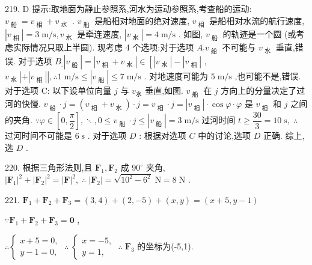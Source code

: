 219. D 提示:取地面为静止参照系,河水为运动参照系,考查船的运动: ${v}_{\text{ 船 }} = {v}_{\text{ 相 }} + {v}_{\text{ 水 }}$ . ${v}_{\text{ 船 }}$ 是船相对地面的绝对速度, ${v}_{\text{ 相 }}$ 是船相对水流的航行速度, $\left| {v}_{\text{ 相 }}\right|  = 3\mathrm{\;m}/\mathrm{s},{v}_{\text{ 水 }}$ 是牵连速度, $\left| {v}_{\text{ 水 }}\right|  = 4\mathrm{\;m}/\mathrm{s}$ . 如图, ${v}_{\text{ 船 }}$ 的轨迹是一个圆 (或考虑实际情况只取上半圆). 现考虑 4 个选项:对于选项 ${A}_{:}{v}_{\text{ 船 }}$ 不可能与 ${v}_{\text{ 水 }}$ 垂直,错误. 对于选项 ${B}_{:}\left| {v}_{\text{ 船 }}\right|  = \left| {{v}_{\text{ 相 }} + {v}_{\text{ 水 }}}\right|  \in  \left\lbrack  {\left| {v}_{\text{ 水 }}\right|  - \left| {v}_{\text{ 相 }}\right| }\right.$ , ${v}_{\text{ 水 }}\left| {+\left| {v}_{\text{ 相 }}\right| }\right| ,\therefore 1\mathrm{\;m}/\mathrm{s} \leq  \left| {v}_{\text{ 船 }}\right|  \leq  7\mathrm{\;m}/\mathrm{s}$ . 对地速度可能为 $5\mathrm{\;m}/\mathrm{s}$ ,也可能不是,错误. 对于选项 C: 以下设单位向量 $j$ 与 ${v}_{水}$ 垂直,如图. ${v}_{\text{ 船 }}$ 在 $j$ 方向上的分量决定了过河的快慢. ${v}_{\text{ 船 }} \cdot  j = \left( {{v}_{\text{ 相 }} + {v}_{\text{ 水 }}}\right)  \cdot  j = {v}_{\text{ 相 }} \cdot  j = \left| {v}_{\text{ 相 }}\right|  \cdot  \cos \varphi  \cdot  \varphi$ 是 ${v}_{\text{ 相 }}$ 和 $j$ 之间的夹角. $\because \varphi  \in  \left\lbrack  {0,\dfrac{\pi }{2}}\right\rbrack  , \ddots  ,0 \leq  {v}_{\text{ 船 }} \cdot  j \leq  \left| {v}_{\text{ 船 }}\right|  = 3\mathrm{\;m}/\mathrm{s}$ 过河时间 $t \geq  \dfrac{30}{3} = {10}\mathrm{\;s},\;\therefore$ 过河时间不可能是 $6\mathrm{\;s}$ . 对于选项 $D$ : 根据对选项 $C$ 中的讨论,选项 $D$ 正确. 综上,选 $D$ .

220. 根据三角形法则,且 ${\mathbf{F}}_{1},{\mathbf{F}}_{2}$ 成 ${90}^{ \circ  }$ 夹角, ${\left| {\mathbf{F}}_{1}\right| }^{2} + {\left| {\mathbf{F}}_{2}\right| }^{2} = {\left| \mathbf{F}\right| }^{2},\;\therefore \;\left| {\mathbf{F}}_{2}\right|  = \sqrt{{10}^{2} - {6}^{2}}\mathrm{\;N} = 8\mathrm{\;N}$ .

221. ${\mathbf{F}}_{1} + {\mathbf{F}}_{2} + {\mathbf{F}}_{3} = \left( {3,4}\right)  + \left( {2, - 5}\right)  + \left( {x,y}\right)  = \left( {x + 5,y - 1}\right)$

$\because {\mathbf{F}}_{1} + {\mathbf{F}}_{2} + {\mathbf{F}}_{3} = \mathbf{0}$ ,

$\therefore \left\{  {\begin{array}{l} x + 5 = 0, \\  y - 1 = 0, \end{array}\;\therefore \;\left\{  {\begin{array}{l} x =  - 5, \\  y = 1, \end{array}\;\therefore \;{\mathbf{F}}_{3}}\right. }\right.$ 的坐标为(-5,1).

